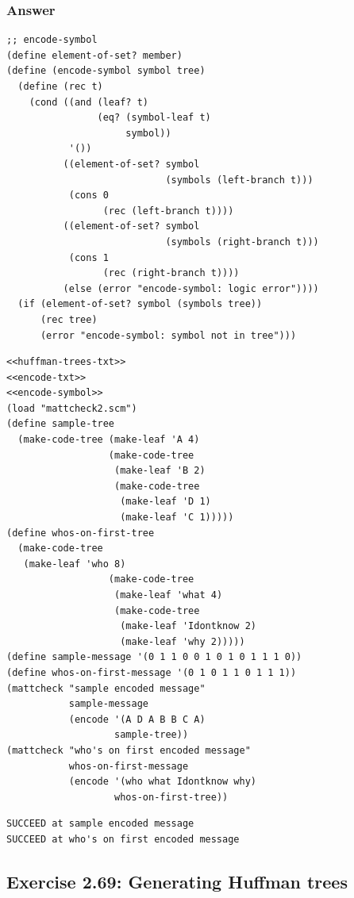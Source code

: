 \documentclass[final,fleqn,titlepage,twoside]{article}
\begin{document}
\subsubsection{Answer}
\label{sec:orgabeef88}
\begin{verbatim}
;; encode-symbol
(define element-of-set? member)
(define (encode-symbol symbol tree)
  (define (rec t)
    (cond ((and (leaf? t)
                (eq? (symbol-leaf t)
                     symbol))
           '())
          ((element-of-set? symbol
                            (symbols (left-branch t)))
           (cons 0
                 (rec (left-branch t))))
          ((element-of-set? symbol
                            (symbols (right-branch t)))
           (cons 1
                 (rec (right-branch t))))
          (else (error "encode-symbol: logic error"))))
  (if (element-of-set? symbol (symbols tree))
      (rec tree)
      (error "encode-symbol: symbol not in tree")))
\end{verbatim}

\begin{verbatim}
<<huffman-trees-txt>>
<<encode-txt>>
<<encode-symbol>>
(load "mattcheck2.scm")
(define sample-tree
  (make-code-tree (make-leaf 'A 4)
                  (make-code-tree
                   (make-leaf 'B 2)
                   (make-code-tree
                    (make-leaf 'D 1)
                    (make-leaf 'C 1)))))
(define whos-on-first-tree
  (make-code-tree
   (make-leaf 'who 8)
                  (make-code-tree
                   (make-leaf 'what 4)
                   (make-code-tree
                    (make-leaf 'Idontknow 2)
                    (make-leaf 'why 2)))))
(define sample-message '(0 1 1 0 0 1 0 1 0 1 1 1 0))
(define whos-on-first-message '(0 1 0 1 1 0 1 1 1))
(mattcheck "sample encoded message"
           sample-message
           (encode '(A D A B B C A)
                   sample-tree))
(mattcheck "who's on first encoded message"
           whos-on-first-message
           (encode '(who what Idontknow why)
                   whos-on-first-tree))
\end{verbatim}

\begin{verbatim}
SUCCEED at sample encoded message
SUCCEED at who's on first encoded message
\end{verbatim}

\subsection{Exercise 2.69: Generating Huffman trees}
\label{sec:orgeb359a6}
\end{document}
